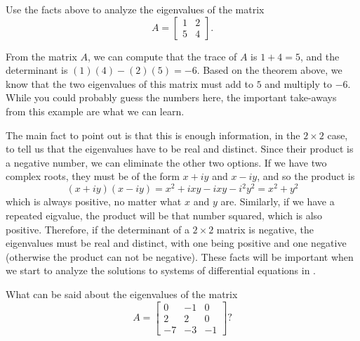 \documentclass{ximera}
\begin{document}
\begin{example}
    Use the facts above to analyze the eigenvalues of the matrix
    \begin{equation*}
        A = 
        \begin{bmatrix} 
            1 & 2 \\ 
            5 & 4 
        \end{bmatrix}.
    \end{equation*}
\end{example}
\begin{exampleSol}
    From the matrix $A$, we can compute that the trace of $A$ is $1+4=5$, and the determinant is $(1)(4) - (2)(5) = -6$. Based on the theorem above, we know that the two eigenvalues of this matrix must add to $5$ and multiply to $-6$. While you could probably guess the numbers here, the important take-aways from this example are what we can learn.
    
    The main fact to point out is that this is enough information, in the $2 \times 2$ case, to tell us that the eigenvalues have to be real and distinct. Since their product is a negative number, we can eliminate the other two options. If we have two complex roots, they must be of the form $x + iy$ and $x-iy$, and so the product is 
    \begin{equation*}
        (x+iy)(x-iy) = x^2 + ixy - ixy  - i^2y^2 = x^2 + y^2
    \end{equation*}
    which is always positive, no matter what $x$ and $y$ are. Similarly, if we have a repeated eigvalue, the product will be that number squared, which is also positive. Therefore, if the determinant of a $ 2 \times 2$ matrix is negative, the eigenvalues must be real and distinct, with one being positive and one negative (otherwise the product can not be negative). These facts will be important when we start to analyze the solutions to systems of differential equations in .
\end{exampleSol}

\begin{example}
    What can be said about the eigenvalues of the matrix
    \begin{equation*}
        A = \begin{bmatrix}
            0 & -1 &  0 \\
            2 & 2 &  0 \\
            -7 &-3 & -1
        \end{bmatrix}?
    \end{equation*}
\end{example}
\end{document}
